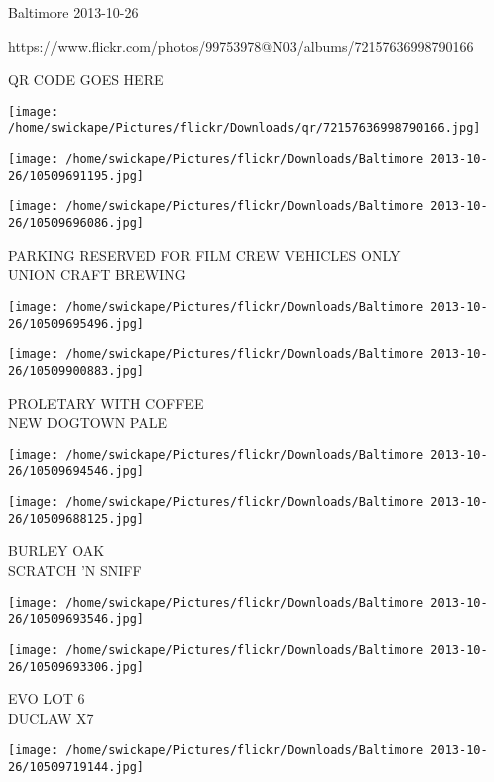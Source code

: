 \documentclass[10pt,letterpaper]{article}
\begin{document}
Baltimore 2013-10-26

https://www.flickr.com/photos/99753978@N03/albums/72157636998790166

QR CODE GOES HERE

\texttt{[image: /home/swickape/Pictures/flickr/Downloads/qr/72157636998790166.jpg]}
\pagebreak

\texttt{[image: /home/swickape/Pictures/flickr/Downloads/Baltimore 2013-10-26/10509691195.jpg]}

\vspace{0.25in}
\texttt{[image: /home/swickape/Pictures/flickr/Downloads/Baltimore 2013-10-26/10509696086.jpg]}

PARKING RESERVED FOR FILM CREW VEHICLES ONLY\\
UNION CRAFT BREWING\\
\pagebreak

\texttt{[image: /home/swickape/Pictures/flickr/Downloads/Baltimore 2013-10-26/10509695496.jpg]}

\vspace{0.25in}
\texttt{[image: /home/swickape/Pictures/flickr/Downloads/Baltimore 2013-10-26/10509900883.jpg]}

PROLETARY WITH COFFEE\\
NEW DOGTOWN PALE\\
\pagebreak

\texttt{[image: /home/swickape/Pictures/flickr/Downloads/Baltimore 2013-10-26/10509694546.jpg]}

\vspace{0.25in}
\texttt{[image: /home/swickape/Pictures/flickr/Downloads/Baltimore 2013-10-26/10509688125.jpg]}

BURLEY OAK\\
SCRATCH 'N SNIFF\\
\pagebreak

\texttt{[image: /home/swickape/Pictures/flickr/Downloads/Baltimore 2013-10-26/10509693546.jpg]}

\vspace{0.25in}
\texttt{[image: /home/swickape/Pictures/flickr/Downloads/Baltimore 2013-10-26/10509693306.jpg]}

EVO LOT 6\\
DUCLAW X7\\
\pagebreak

\texttt{[image: /home/swickape/Pictures/flickr/Downloads/Baltimore 2013-10-26/10509719144.jpg]}
\end{document}

